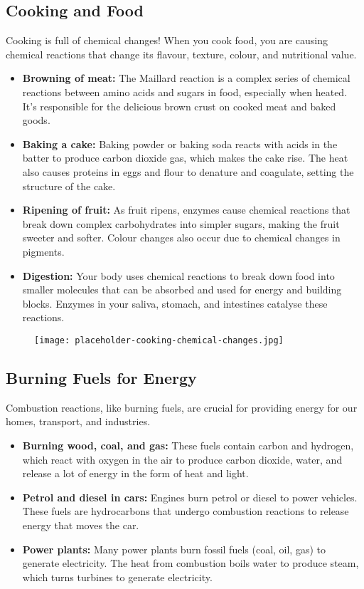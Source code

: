 \subsection{Cooking and Food}

Cooking is full of chemical changes! When you cook food, you are causing chemical reactions that change its flavour, texture, colour, and nutritional value.

\begin{itemize}
    \item \textbf{Browning of meat:}  The Maillard reaction is a complex series of chemical reactions between amino acids and sugars in food, especially when heated. It's responsible for the delicious brown crust on cooked meat and baked goods.
    \item \textbf{Baking a cake:}  Baking powder or baking soda reacts with acids in the batter to produce carbon dioxide gas, which makes the cake rise. The heat also causes proteins in eggs and flour to denature and coagulate, setting the structure of the cake.
    \item \textbf{Ripening of fruit:} As fruit ripens, enzymes cause chemical reactions that break down complex carbohydrates into simpler sugars, making the fruit sweeter and softer. Colour changes also occur due to chemical changes in pigments.
    \item \textbf{Digestion:}  Your body uses chemical reactions to break down food into smaller molecules that can be absorbed and used for energy and building blocks. Enzymes in your saliva, stomach, and intestines catalyse these reactions.
\end{itemize}

\begin{figure}
\centering
\texttt{[image: placeholder-cooking-chemical-changes.jpg]}
\end{figure}

\subsection{Burning Fuels for Energy}

Combustion reactions, like burning fuels, are crucial for providing energy for our homes, transport, and industries.

\begin{itemize}
    \item \textbf{Burning wood, coal, and gas:}  These fuels contain carbon and hydrogen, which react with oxygen in the air to produce carbon dioxide, water, and release a lot of energy in the form of heat and light.
    \item \textbf{Petrol and diesel in cars:}  Engines burn petrol or diesel to power vehicles. These fuels are hydrocarbons that undergo combustion reactions to release energy that moves the car.
    \item \textbf{Power plants:} Many power plants burn fossil fuels (coal, oil, gas) to generate electricity. The heat from combustion boils water to produce steam, which turns turbines to generate electricity.
\end{itemize}

